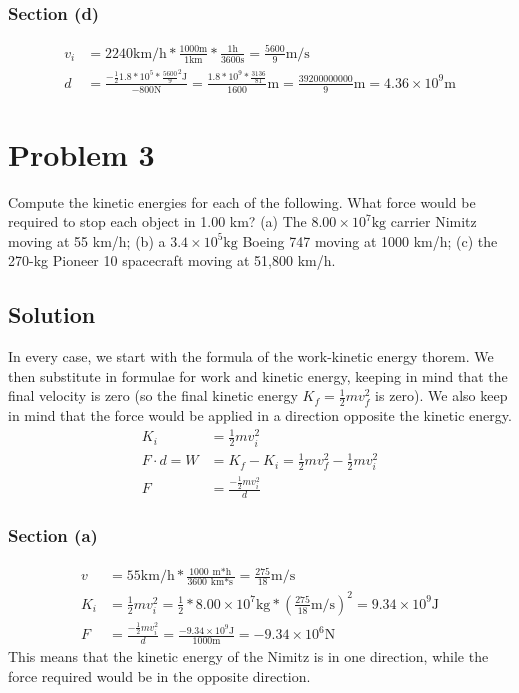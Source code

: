 \documentclass[12pt]{article}
\begin{document}
\subsubsection*{Section (d)}
\begin{align*}
    v_i &= 2240 \unit{\kilo\meter/\hour} * \frac{1000 \unit{\meter}}{1 \unit{\kilo\meter}} * \frac{1 \unit{\hour}}{3600 \unit{\second}} = \frac{5600}{9} \unit{\meter/\second}\\
    d   &= \frac{-\frac{1}{2}1.8*10^5*\frac{5600}{9}^2 \unit{\joule}}{-800 \unit{\newton}}
        = \frac{1.8*10^9*\frac{3136}{81}}{1600} \unit{\meter} 
        = \boxed{\frac{39200000000}{9} \unit{\meter} = 4.36 \times 10^9 \unit{\meter}}
\end{align*}

\pagebreak
\section*{Problem 3}
Compute the kinetic energies for each of the following. What force would be required to stop each object in 1.00 km? (a) The $8.00 \times 10^7 \unit{\kilo\gram}$ carrier Nimitz moving at 55 km/h; (b) a $3.4 \times 10^5 \unit{\kilo\gram}$ Boeing 747 moving at 1000 km/h; (c) the 270-kg Pioneer 10 spacecraft moving at 51,800 km/h.

\subsection*{Solution}
In every case, we start with the formula of the work-kinetic energy thorem. We then substitute in formulae for work and kinetic energy, keeping in mind that the final velocity is zero (so the final kinetic energy $K_f = \frac{1}{2}mv_f^2$ is zero). We also keep in mind that the force would be applied in a direction opposite the kinetic energy.
\begin{align*}
    K_i &= \frac{1}{2}mv_i^2\\
    F \cdot d = W   &= K_f - K_i = \frac{1}{2}mv_f^2 - \frac{1}{2}mv_i^2\\
    F   &= \frac{-\frac{1}{2}mv_i^2}{d}
\end{align*}

\subsubsection*{Section (a)}
\begin{align*}
    v   &= 55 \unit{\kilo\meter/\hour} * \frac{1000\ \unit{\meter*\hour}}{3600\ \unit{\kilo\meter*\second}} 
        = \frac{275}{18} \unit{\meter/\second}\\
    K_i &= \frac{1}{2}mv_i^2 
        = \frac{1}{2} * 8.00 \times 10^7 \unit{\kilo\gram} * \left( \frac{275}{18} \unit{\meter/\second} \right)^2 
        = 9.34 \times 10^9 \unit{\joule}\\
    F   &= \frac{-\frac{1}{2}mv_i^2}{d}
        = \frac{-9.34 \times 10^9 \unit{\joule}}{1000 \unit{\meter}}
        = -9.34 \times 10^6 \unit{\newton}
\end{align*}
This means that the kinetic energy of the Nimitz is  in one direction, while the force required would be  in the opposite direction.
\end{document}
